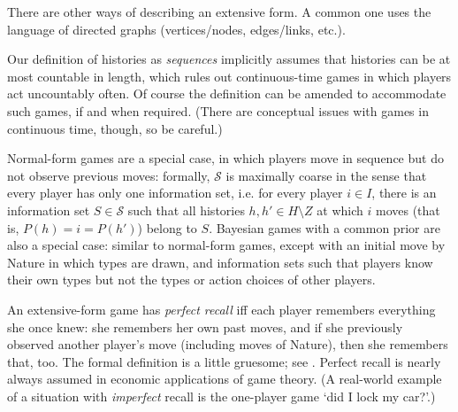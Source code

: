 \documentclass[11pt,letterpaper,reqno,oneside]{book}
\begin{document}
There are other ways of describing an extensive form. A common one uses the language of directed graphs (vertices/nodes, edges/links, etc.). 

\begin{remark}[technical]
	\label{remark:conts_time}
	Our definition of histories as \emph{sequences} implicitly assumes that histories can be at most countable in length, which rules out continuous-time games in which players act uncountably often. Of course the definition can be amended to accommodate such games, if and when required. (There are conceptual issues with games in continuous time, though, so be careful.)
\end{remark}

Normal-form games are a special case, in which players move in sequence but do not observe previous moves: formally, $\mathcal{S}$ is maximally coarse in the sense that every player has only one information set, i.e. for every player $i \in I$, there is an information set $S \in \mathcal{S}$ such that all
histories $h,h' \in H \setminus Z$ at which $i$ moves (that is, $P(h)=i=P(h')$) belong to $S$. Bayesian games with a common prior are also a special case: similar to normal-form games, except with an initial move by Nature in which types are drawn, and information sets such that players know their own types but not the types or action choices of other players.

An extensive-form game has \emph{perfect recall} iff each player remembers everything she once knew: she remembers her own past moves, and if she previously observed another player's move (including moves of Nature), then she remembers that, too. The formal definition is a little gruesome; see \textcite[][section~11.1.3]{OsborneRubinstein1994}. Perfect recall is nearly always assumed in economic applications of game theory. (A real-world example of a situation with \emph{imperfect} recall is the one-player game `did I lock my car?'.)
\end{document}
